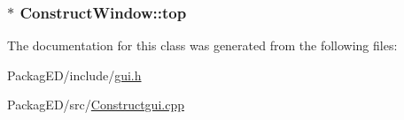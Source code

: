 \subsubsection[{\texorpdfstring{top}{top}}]{ $\ast$ Construct\+Window\+::top\hspace{0.3cm}{\ttfamily [private]}}\hypertarget{class_construct_window_a400b924c57cd3a4f09165a5f5862f3cb}{}\label{class_construct_window_a400b924c57cd3a4f09165a5f5862f3cb}


The documentation for this class was generated from the following files\+:\begin{DoxyCompactItemize}
\item 
Packag\+E\+D/include/\hyperlink{gui_8h}{gui.\+h}\item 
Packag\+E\+D/src/\hyperlink{_constructgui_8cpp}{Constructgui.\+cpp}\end{DoxyCompactItemize}
